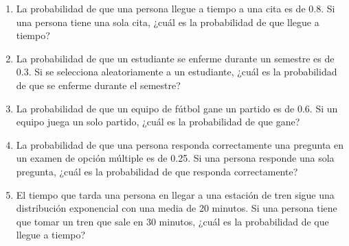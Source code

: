 \begin{Ejer}
\begin{enumerate}
    \item La probabilidad de que una persona llegue a tiempo a una cita es de 0.8. Si una persona tiene una sola cita, ¿cuál es la probabilidad de que llegue a tiempo?
    \item La probabilidad de que un estudiante se enferme durante un semestre es de 0.3. Si se selecciona aleatoriamente a un estudiante, ¿cuál es la probabilidad de que se enferme durante el semestre?
    \item La probabilidad de que un equipo de fútbol gane un partido es de 0.6. Si un equipo juega un solo partido, ¿cuál es la probabilidad de que gane?
    \item La probabilidad de que una persona responda correctamente una pregunta en un examen de opción múltiple es de 0.25. Si una persona responde una sola pregunta, ¿cuál es la probabilidad de que responda correctamente?
    \item El tiempo que tarda una persona en llegar a una estación de tren sigue una distribución exponencial con una media de 20 minutos. Si una persona tiene que tomar un tren que sale en 30 minutos, ¿cuál es la probabilidad de que llegue a tiempo?
    
\end{enumerate}
\end{Ejer} 


